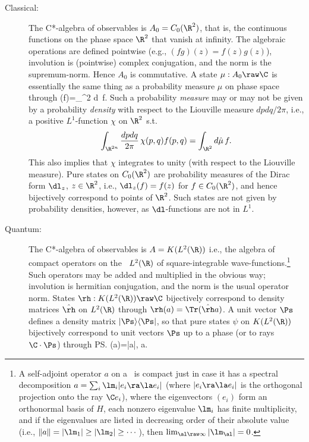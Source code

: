 \documentclass[12pt]{article}
\begin{document}
\begin{description}
\item[Classical:] The C*-algebra of observables is $A_0=C_0(\R^2)$, that is, the continuous functions on the phase space $\R^2$ that vanish at infinity.
The algebraic operations are defined pointwise (e.g., $(fg)(z)=f(z)g(z)$), involution is (pointwise) complex conjugation, and the norm is the supremum-norm. Hence $A_0$ is commutative. A state  $\mu:A_0\raw\C$ is essentially the same thing as a probability measure $\hat{\mu}$ on phase space through
\beq\mu(f)=\int_{\R^2} d\hat{\mu}\, f.
\eeq
Such a probability  \emph{measure} may or may not be given by a probability  \emph{density} with respect to the Liouville measure $dpdq/2\pi$, i.e., a positive $L^1$-function $\chi$ on $\R^2$ s.t.
\begin{equation}
\int_{\R^{2n}} \frac{dp
dq}{2\pi}\, \chi(p,q) f(p,q)=
\int_{\R^2} d\hat{\mu}\, f. \label{maymaynot}
\end{equation}
This also implies that $\chi$  integrates to unity (with respect to the Liouville measure).
Pure states on $C_0(\R^2)$ are probability measures of the Dirac form $\dl_z$, $z\in\R^2$, i.e., $\dl_z(f)=f(z)$ for $f\in C_0(\R^2)$,  and hence bijectively  correspond to
 points of $\R^2$. Such states are not given by probability densities, however, as $\dl$-functions are not in $L^1$. 
\item[Quantum:] The C*-algebra of observables is $A=K(L^2(\R))$ i.e., the algebra of compact operators on the \Hs\ $L^2(\R)$ of square-integrable wave-functions.\footnote{A self-adjoint operator $a$ on a \Hs\ is compact just in case it has a spectral decomposition $a=\sum_i \lm_i |e_i\ra \la e_i|$ (where $|e_i\ra \la e_i|$ is the orthogonal projection onto the ray $\C e_i$), where  the eigenvectors $(e_i)$ form an orthonormal basis of $H$, each nonzero eigenvalue $\lm_i$ has finite multiplicity, and  if the eigenvalues are listed in decreasing order of their absolute value (i.e.,
$\|a\|=|\lm_1|\geq |\lm_2| \geq \cdots$), then $\lim_{\al\raw\infty} |\lm_{\al}|=0$. } 
Such operators may be added and multiplied in the obvious way; involution is hermitian conjugation, and the norm is the usual operator norm.
States
$\rh:K(L^2(\R))\raw\C$  bijectively correspond to density matrices $\hat{\rh}$ on $L^2(\R)$ through  $\rh(a)= \Tr (\hat{\rh} a)$.  
A unit vector $\Ps$ defines a  density matrix $|\Ps\rangle\langle\Ps|$, so that
pure states $\psi$ on $K(L^2(\R))$ bijectively correspond to unit vectors $\Ps$ up to a phase (or to rays $\C\cdot\Ps$)  through
 \beq
 \ps(a)=\la\Ps|a|\Ps\ra\equiv \la\Ps, a\Ps\ra. \label{ps}
 \eeq
\end{description}
\end{document}
